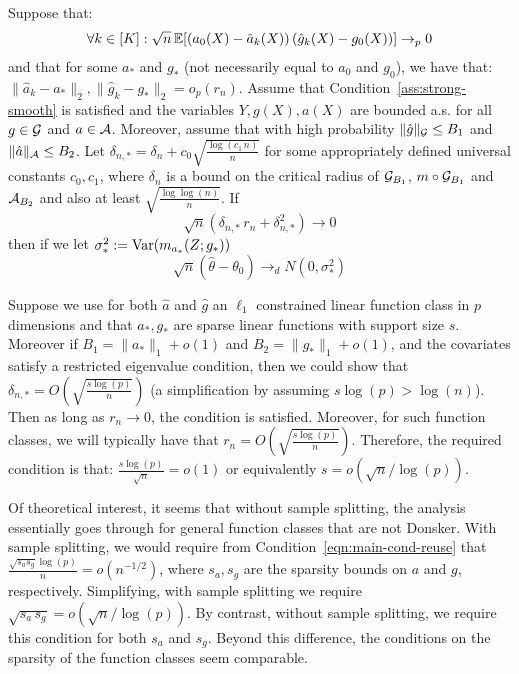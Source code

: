 \begin{lemma}\label{lem:debias-nocross}
Suppose that:
\begin{align}\label{eqn:main-cond-reuse}
    \forall k \in [K]: \sqrt{n}\, \mathbb{E}[(a_0(X) - \hat{a}_k(X))\, (\hat{g}_k(X) - g_0(X))] \rightarrow_p 0
\end{align}
and that for some $a_*$ and $g_*$ (not necessarily equal to $a_0$ and $g_0$), we have that: $\|\hat{a}_k-a_*\|_2, \|\hat{g}_k-g_*\|_2 = o_p(r_n)$. Assume that Condition~\ref{ass:strong-smooth} is satisfied and the variables $Y, g(X), a(X)$ are bounded a.s. for all $g\in {\mathcal G}$ and $a\in {\mathcal A}$. Moreover, assume that with high probability $\|\hat{g}\|_{{\mathcal G}} \leq B_1$ and $\|\hat{a}\|_{{\mathcal A}} \leq B_2$. Let $\delta_{n,*} = \delta_{n} + c_0 \sqrt{\frac{\log(c_1\, n)}{n}}$ for some appropriately defined universal constants $c_0, c_1$, where $\delta_n$ is a bound on the critical radius of ${\mathcal G}_{B_1}$, $m\circ {\mathcal G}_{B_1}$ and ${\mathcal A}_{B_2}$ and also at least $\sqrt{\frac{\log\log(n)}{n}}$. If \begin{equation}
\sqrt{n}\left(\delta_{n,*}\, r_n + \delta_{n,*}^2\right)\to 0
\end{equation}
then if we let $\sigma_*^2 := \text{Var}(m_{a_*}(Z; g_*))$
\begin{equation}
    \sqrt{n}\left(\hat{\theta} - \theta_0\right) \to_d N\left(0, \sigma_*^2\right)
\end{equation}
\end{lemma}


Suppose we use for both $\hat{a}$ and $\hat{g}$ an $\ell_1$ constrained linear function class in $p$ dimensions and that $a_*, g_*$ are sparse linear functions with support size $s$. Moreover if $B_1=\|a_*\|_1 + o(1)$ and $B_2=\|g_*\|_1 + o(1)$, and the covariates satisfy a restricted eigenvalue condition, then we could show that $\delta_{n, *}=O\left(\sqrt{\frac{s\log(p)}{n}}\right)$ (a simplification by assuming $s\log(p)>\log(n)$). Then as long as $r_n \to 0$, the condition is satisfied. Moreover, for such function classes, we will typically have that $r_n = O\left(\sqrt{\frac{s\log(p)}{n}}\right)$. Therefore, the required condition is that: $\frac{s\log(p)}{\sqrt{n}}=o(1)$ or equivalently $s=o\left(\sqrt{n}/\log(p)\right)$. 

Of theoretical interest, it seems that without sample splitting, the analysis essentially goes through for general function classes that are not Donsker. With sample splitting, we would require from Condition~\eqref{eqn:main-cond-reuse} that $\frac{\sqrt{s_{a} s_{g}} \log(p)}{n} = o(n^{-1/2})$, where $s_a, s_g$ are the sparsity bounds on $a$ and $g$, respectively. Simplifying, with sample splitting we require $\sqrt{s_a\, s_g} = o\left(\sqrt{n}/\log(p)\right)$. By contrast, without sample splitting, we require this condition for both $s_a$ and $s_g$. Beyond this difference, the conditions on the sparsity of the function classes seem comparable.

